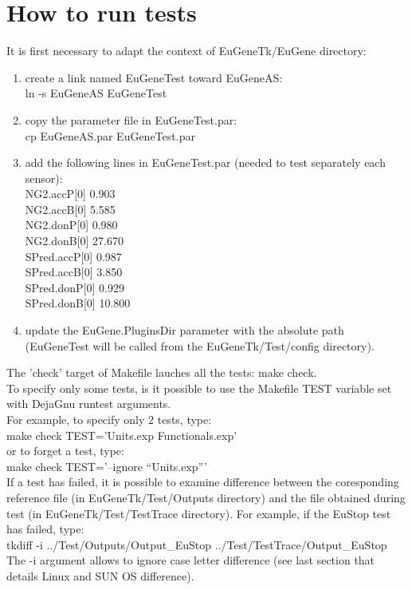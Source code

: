 \documentclass[a4paper,11pt]{article}
\begin{document}
\section{How to run tests}
It is first necessary to adapt the context of EuGeneTk/EuGene directory:
\begin{enumerate}
\item create a link named EuGeneTest toward EuGeneAS:\\
         {\sf ln -s EuGeneAS EuGeneTest}
\item copy the parameter file in EuGeneTest.par:\\ 
         {\sf cp EuGeneAS.par EuGeneTest.par}
\item add the following lines in EuGeneTest.par (needed to test separately each sensor):\\
{\sf NG2.accP[0] 0.903\\ 
NG2.accB[0] 5.585\\ 
NG2.donP[0] 0.980\\ 
NG2.donB[0] 27.670\\ 
SPred.accP[0] 0.987\\ 
SPred.accB[0] 3.850\\ 
SPred.donP[0] 0.929\\ 
SPred.donB[0] 10.800}
\item update the EuGene.PluginsDir parameter with the absolute path (EuGeneTest will be called from the EuGeneTk/Test/config directory).
\end{enumerate}
\vspace{0.5cm}
The 'check' target of Makefile lauches all the tests: {\sf make check}.\\
To specify only some tests, is it possible to use the Makefile TEST variable set with DejaGnu runtest arguments.\\
For example, to specify only 2 tests, type: \\
{\sf make check TEST='Units.exp Functionals.exp'} \\
or to forget a test, type: \\
{\sf make check TEST='--ignore ``Units.exp'''}\\
\vspace{0.5cm}
If a test has failed, it is possible to examine difference between the coresponding reference file (in EuGeneTk/Test/Outputs directory) and the file obtained during test (in EuGeneTk/Test/TestTrace directory).
For example, if the EuStop test has failed, type: \\
{\sf tkdiff -i ../Test/Outputs/Output\_EuStop ../Test/TestTrace/Output\_EuStop}\\
The -i argument allows to ignore case letter difference (see last section that details Linux and SUN OS difference).
\end{document}
